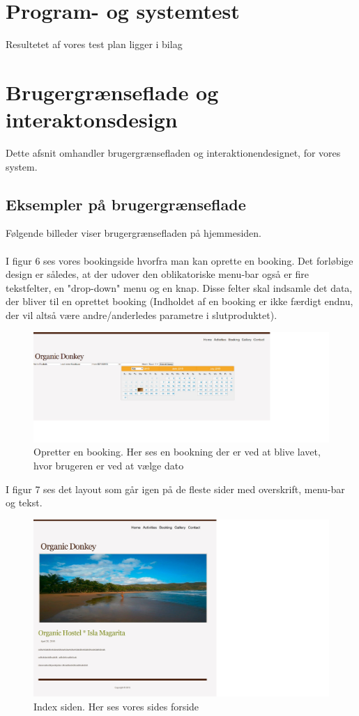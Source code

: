 \documentclass[12pt,a4paper]{article}
\begin{document}
\section{Program- og systemtest}
Resultetet af vores test plan ligger i bilag
\newpage
\section{Brugergrænseflade og interaktonsdesign}
Dette afsnit omhandler brugergrænsefladen og interaktionendesignet, for vores system. 
\subsection{Eksempler på brugergrænseflade}
Følgende billeder viser brugergrænsefladen på hjemmesiden.\\\\
I figur 6 ses vores bookingside hvorfra man kan oprette en booking. 
Det forløbige design er således, at der udover den oblikatoriske menu-bar 
også er fire tekstfelter, en "drop-down" menu og en knap.
Disse felter skal indsamle det data, der bliver til en oprettet booking 
(Indholdet af en booking er ikke færdigt endnu, 
der vil altså være andre/anderledes parametre i slutproduktet). 
\begin{figure}[H]
\centering
\includegraphics[scale=0.5] {brugergransefladebilled1.jpg}
\caption{Opretter en booking. Her ses en bookning der er ved at blive lavet, hvor brugeren er ved at vælge dato}
\end{figure}
\newpage
I figur 7 ses det layout som går igen på de fleste sider
 med overskrift, menu-bar og tekst.
\begin{figure}[H]
\centering
\includegraphics[scale=0.6] {brugergransefladebilled2.jpg}
\caption{Index siden. Her ses vores sides forside} 
\end{figure} 
\end{document}
